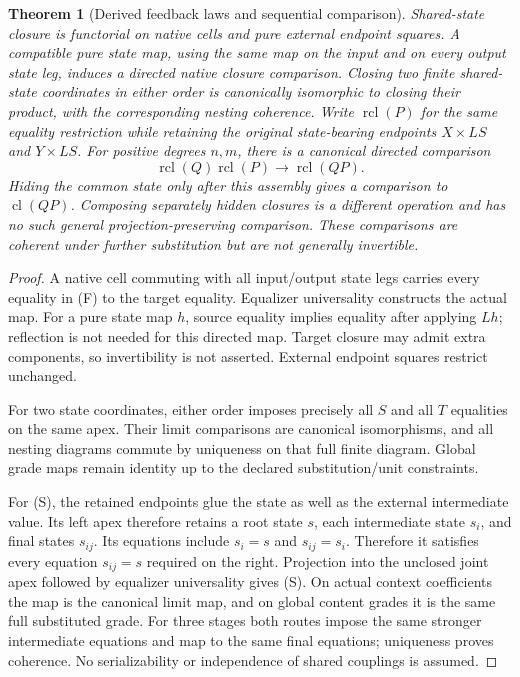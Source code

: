 \documentclass[11pt]{article}
\newtheorem{theorem}{Theorem}\newtheorem{proposition}[theorem]{Proposition}
\begin{document}
\begin{theorem}[Derived feedback laws and sequential comparison]
Shared-state closure is functorial on native cells and pure external endpoint squares. A compatible pure state map, using the same map on the input and on every output state leg, induces a directed native closure comparison. Closing two finite shared-state coordinates in either order is canonically isomorphic to closing their product, with the corresponding nesting coherence. Write $\operatorname{rcl}(P)$ for the same equality restriction while retaining the original state-bearing endpoints $X\times LS$ and $Y\times LS$. For positive degrees $n,m$, there is a canonical directed comparison
\[
 \operatorname{rcl}(Q)\operatorname{rcl}(P)
 \longrightarrow \operatorname{rcl}(QP). \tag{S}
\]
Hiding the common state only after this assembly gives a comparison to $\operatorname{cl}(QP)$. Composing separately hidden closures is a different operation and has no such general projection-preserving comparison. These comparisons are coherent under further substitution but are not generally invertible.
\end{theorem}
\begin{proof}
A native cell commuting with all input/output state legs carries every equality in (F) to the target equality. Equalizer universality constructs the actual map. For a pure state map $h$, source equality implies equality after applying $Lh$; reflection is not needed for this directed map. Target closure may admit extra components, so invertibility is not asserted. External endpoint squares restrict unchanged.

For two state coordinates, either order imposes precisely all $S$ and all $T$ equalities on the same apex. Their limit comparisons are canonical isomorphisms, and all nesting diagrams commute by uniqueness on that full finite diagram. Global grade maps remain identity up to the declared substitution/unit constraints.

For (S), the retained endpoints glue the state as well as the external intermediate value. Its left apex therefore retains a root state $s$, each intermediate state $s_i$, and final states $s_{ij}$. Its equations include $s_i=s$ and $s_{ij}=s_i$. Therefore it satisfies every equation $s_{ij}=s$ required on the right. Projection into the unclosed joint apex followed by equalizer universality gives (S). On actual context coefficients the map is the canonical limit map, and on global content grades it is the same full substituted grade. For three stages both routes impose the same stronger intermediate equations and map to the same final equations; uniqueness proves coherence. No serializability or independence of shared couplings is assumed.
\end{proof}
\end{document}

